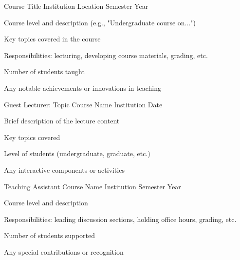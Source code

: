 
\begin{cventries}
    \cventry
    {Course Title} %
    {Institution} %
    {Location} %
    {Semester Year} %
    {
      \begin{cvitems} %
        \item {Course level and description (e.g., "Undergraduate course on...")}
        \item {Key topics covered in the course}
        \item {Responsibilities: lecturing, developing course materials, grading, etc.}
        \item {Number of students taught}
        \item {Any notable achievements or innovations in teaching}
      \end{cvitems}
    }

    \cventry
    {Guest Lecturer: Topic} %
    {Course Name} %
    {Institution} %
    {Date} %
    {
      \begin{cvitems} %
        \item {Brief description of the lecture content}
        \item {Key topics covered}
        \item {Level of students (undergraduate, graduate, etc.)}
        \item {Any interactive components or activities}
      \end{cvitems}
    }

    \cventry
    {Teaching Assistant} %
    {Course Name} %
    {Institution} %
    {Semester Year} %
    {
      \begin{cvitems} %
        \item {Course level and description}
        \item {Responsibilities: leading discussion sections, holding office hours, grading, etc.}
        \item {Number of students supported}
        \item {Any special contributions or recognition}
      \end{cvitems}
    }


\end{cventries}
